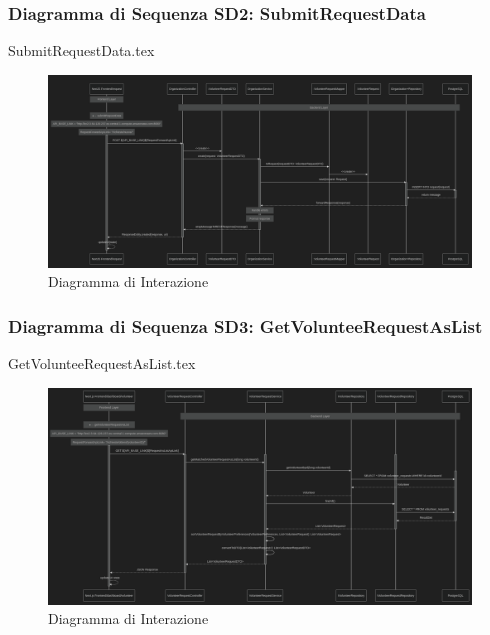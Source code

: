 \documentclass[12pt]{article}
\begin{document}
\subsubsection{Diagramma di Sequenza SD2: SubmitRequestData}
{SubmitRequestData.tex}

\begin{figure}[H]
    \includegraphics[width=\textwidth, height=\textheight,keepaspectratio]{Immagini/SD/Iterazione 1/SDSubmitRequestData.png}
        \caption{Diagramma di Interazione}
        \label{fig:diagrammaSD2}
\end{figure}

\subsubsection{Diagramma di Sequenza SD3: GetVolunteeRequestAsList}
{GetVolunteeRequestAsList.tex}

\begin{figure}[H]
    \includegraphics[width=\textwidth, height=\textheight,keepaspectratio]{Immagini/SD/Iterazione 1/SDGetVolunteeRequestAsList.png}
        \caption{Diagramma di Interazione}
        \label{fig:diagrammaSD3}
\end{figure}
\end{document}
